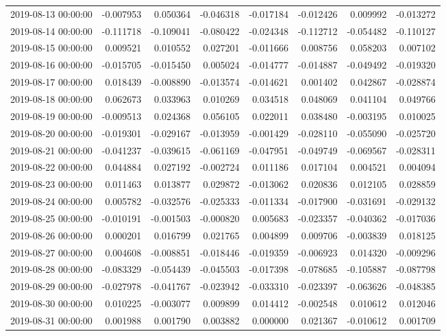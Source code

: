 \begin{tabular}{lrrrrrrr}
2019-08-13 00:00:00 & -0.007953 & 0.050364 & -0.046318 & -0.017184 & -0.012426 & 0.009992 & -0.013272 \\
2019-08-14 00:00:00 & -0.111718 & -0.109041 & -0.080422 & -0.024348 & -0.112712 & -0.054482 & -0.110127 \\
2019-08-15 00:00:00 & 0.009521 & 0.010552 & 0.027201 & -0.011666 & 0.008756 & 0.058203 & 0.007102 \\
2019-08-16 00:00:00 & -0.015705 & -0.015450 & 0.005024 & -0.014777 & -0.014887 & -0.049492 & -0.019320 \\
2019-08-17 00:00:00 & 0.018439 & -0.008890 & -0.013574 & -0.014621 & 0.001402 & 0.042867 & -0.028874 \\
2019-08-18 00:00:00 & 0.062673 & 0.033963 & 0.010269 & 0.034518 & 0.048069 & 0.041104 & 0.049766 \\
2019-08-19 00:00:00 & -0.009513 & 0.024368 & 0.056105 & 0.022011 & 0.038480 & -0.003195 & 0.010025 \\
2019-08-20 00:00:00 & -0.019301 & -0.029167 & -0.013959 & -0.001429 & -0.028110 & -0.055090 & -0.025720 \\
2019-08-21 00:00:00 & -0.041237 & -0.039615 & -0.061169 & -0.047951 & -0.049749 & -0.069567 & -0.028311 \\
2019-08-22 00:00:00 & 0.044884 & 0.027192 & -0.002724 & 0.011186 & 0.017104 & 0.004521 & 0.004094 \\
2019-08-23 00:00:00 & 0.011463 & 0.013877 & 0.029872 & -0.013062 & 0.020836 & 0.012105 & 0.028859 \\
2019-08-24 00:00:00 & 0.005782 & -0.032576 & -0.025333 & -0.011334 & -0.017900 & -0.031691 & -0.029132 \\
2019-08-25 00:00:00 & -0.010191 & -0.001503 & -0.000820 & 0.005683 & -0.023357 & -0.040362 & -0.017036 \\
2019-08-26 00:00:00 & 0.000201 & 0.016799 & 0.021765 & 0.004899 & 0.009706 & -0.003839 & 0.018125 \\
2019-08-27 00:00:00 & 0.004608 & -0.008851 & -0.018446 & -0.019359 & -0.006923 & 0.014320 & -0.009296 \\
2019-08-28 00:00:00 & -0.083329 & -0.054439 & -0.045503 & -0.017398 & -0.078685 & -0.105887 & -0.087798 \\
2019-08-29 00:00:00 & -0.027978 & -0.041767 & -0.023942 & -0.033310 & -0.023397 & -0.063626 & -0.048385 \\
2019-08-30 00:00:00 & 0.010225 & -0.003077 & 0.009899 & 0.014412 & -0.002548 & 0.010612 & 0.012046 \\
2019-08-31 00:00:00 & 0.001988 & 0.001790 & 0.003882 & 0.000000 & 0.021367 & -0.010612 & 0.001709 \\

\end{tabular}
